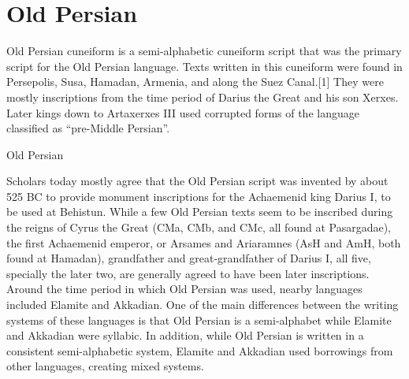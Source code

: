 \section{Old Persian}
\label{s:oldpersian}
\newfontfamily{}

Old Persian cuneiform is a semi-alphabetic cuneiform script that was the primary script for the Old Persian language. Texts written in this cuneiform were found in Persepolis, Susa, Hamadan, Armenia, and along the Suez Canal.[1] They were mostly inscriptions from the time period of Darius the Great and his son Xerxes. Later kings down to Artaxerxes III used corrupted forms of the language classified as “pre-Middle Persian”.

\begin{scriptexample}[]{Old Persian}
\end{scriptexample}

Scholars today mostly agree that the Old Persian script was invented by about 525 BC to provide monument inscriptions for the Achaemenid king Darius I, to be used at Behistun. While a few Old Persian texts seem to be inscribed during the reigns of Cyrus the Great (CMa, CMb, and CMc, all found at Pasargadae), the first Achaemenid emperor, or Arsames and Ariaramnes (AsH and AmH, both found at Hamadan), grandfather and great-grandfather of Darius I, all five, specially the later two, are generally agreed to have been later inscriptions.
Around the time period in which Old Persian was used, nearby languages included Elamite and Akkadian. One of the main differences between the writing systems of these languages is that Old Persian is a semi-alphabet while Elamite and Akkadian were syllabic. In addition, while Old Persian is written in a consistent semi-alphabetic system, Elamite and Akkadian used borrowings from other languages, creating mixed systems.